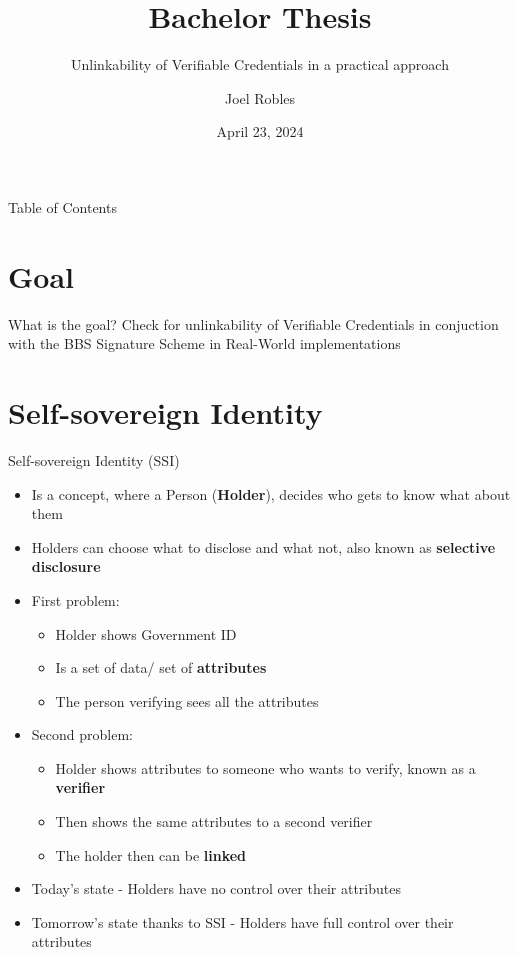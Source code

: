 \documentclass[
	english,%
	authorontitle=true,
	]{bfhbeamer}
\title{Bachelor Thesis}
\subtitle{Unlinkability of Verifiable Credentials in a practical approach}
\author[J. Robles]{Joel Robles}
\institute{TI}
\date{April 23, 2024}
\begin{document}
\maketitle

\begin{frame}{Table of Contents}
    \tableofcontents
\end{frame}

\section{Goal}

\begin{frame}{What is the goal?}
    \centering
    Check for unlinkability of Verifiable Credentials in conjuction with the BBS Signature Scheme in Real-World implementations
\end{frame}

\section{Self-sovereign Identity}

\begin{frame}{Self-sovereign Identity (SSI)}
    \begin{itemize}
        \item Is a concept, where a Person (\textbf{Holder}), decides who gets to know what about them
        \item Holders can choose what to disclose and what not, also known as \textbf{selective disclosure}
        \item First problem: 
        \begin{itemize}
            \item Holder shows Government ID
            \item Is a set of data/ set of \textbf{attributes}
            \item The person verifying sees all the attributes
        \end{itemize}
        \item Second problem:
        \begin{itemize}
            \item Holder shows attributes to someone who wants to verify, known as a \textbf{verifier}
            \item Then shows the same attributes to a second verifier
            \item The holder then can be \textbf{linked}
        \end{itemize}
        \item Today's state - Holders have no control over their attributes
        \item Tomorrow's state thanks to SSI - Holders have full control over their attributes
    \end{itemize}
\end{frame}
\end{document}
